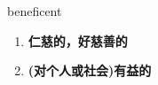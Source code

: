 
\begin{frame}
{\huge beneficent}
\begin{center}
\begin{enumerate}\Large
  \item \textbf{仁慈的，好慈善的}
  \item \textbf{(对个人或社会)有益的}
\end{enumerate}
\end{center}
\end{frame}
